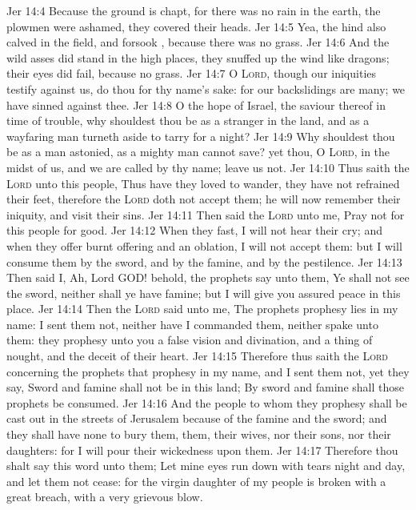 \vs Jer 14:4 Because the ground is chapt, for there was no rain in the earth, the plowmen were ashamed, they covered their heads.
\vs Jer 14:5 Yea, the hind also calved in the field, and forsook , because there was no grass.
\vs Jer 14:6 And the wild asses did stand in the high places, they snuffed up the wind like dragons; their eyes did fail, because  no grass.
\vs Jer 14:7 O \textsc{Lord}, though our iniquities testify against us, do thou  for thy name's sake: for our backslidings are many; we have sinned against thee.
\vs Jer 14:8 O the hope of Israel, the saviour thereof in time of trouble, why shouldest thou be as a stranger in the land, and as a wayfaring man  turneth aside to tarry for a night?
\vs Jer 14:9 Why shouldest thou be as a man astonied, as a mighty man  cannot save? yet thou, O \textsc{Lord},  in the midst of us, and we are called by thy name; leave us not.
\vs Jer 14:10 Thus saith the \textsc{Lord} unto this people, Thus have they loved to wander, they have not refrained their feet, therefore the \textsc{Lord} doth not accept them; he will now remember their iniquity, and visit their sins.
\vs Jer 14:11 Then said the \textsc{Lord} unto me, Pray not for this people for  good.
\vs Jer 14:12 When they fast, I will not hear their cry; and when they offer burnt offering and an oblation, I will not accept them: but I will consume them by the sword, and by the famine, and by the pestilence.
\vs Jer 14:13 Then said I, Ah, Lord GOD! behold, the prophets say unto them, Ye shall not see the sword, neither shall ye have famine; but I will give you assured peace in this place.
\vs Jer 14:14 Then the \textsc{Lord} said unto me, The prophets prophesy lies in my name: I sent them not, neither have I commanded them, neither spake unto them: they prophesy unto you a false vision and divination, and a thing of nought, and the deceit of their heart.
\vs Jer 14:15 Therefore thus saith the \textsc{Lord} concerning the prophets that prophesy in my name, and I sent them not, yet they say, Sword and famine shall not be in this land; By sword and famine shall those prophets be consumed.
\vs Jer 14:16 And the people to whom they prophesy shall be cast out in the streets of Jerusalem because of the famine and the sword; and they shall have none to bury them, them, their wives, nor their sons, nor their daughters: for I will pour their wickedness upon them.
\vs Jer 14:17 Therefore thou shalt say this word unto them; Let mine eyes run down with tears night and day, and let them not cease: for the virgin daughter of my people is broken with a great breach, with a very grievous blow.
